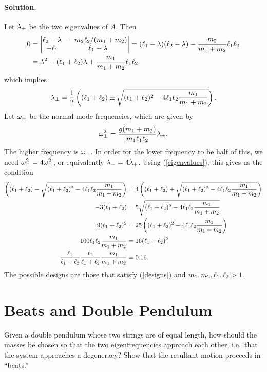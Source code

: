 \documentclass[11pt]{article}
\newcommand{\refeq}[1]{(\ref{#1})}
\newenvironment{statement}
{
    \color{darkgray}
    \ignorespaces
}
{
}
\newenvironment{solution}
{
    \paragraph{Solution.}
    \ignorespaces
}
{
    \bigskip
}
\renewcommand{\vec}[1]{\mathbf{#1}}
\begin{document}
\begin{solution}
	Let $\lambda_\pm$ be the two eigenvalues of $A$.  Then
	\begin{align}
		0 &= \mdet{\elw - \lambda & -\mw \elw / (\mq + \mw) \\ -\elq & \elq - \lambda} = (\elq - \lambda) (\elw - \lambda) - \frac{\mw}{\mq + \mw} \elq \elw \\
		&= \lambda^2 - (\elq + \elw) \lambda + \frac{\mq}{\mq + \mw} \elq \elw
	\end{align}
	which implies
	\begin{equation} \label{eigenvalues}
		\lambda_\pm = \frac{1}{2} \left( (\ell_1 + \ell_2) \pm \sqrt{(\ell_1 + \ell_2)^2 - 4 \ell_1 \ell_2 \frac{m_1}{m_1 + m_2}} \right).
	\end{equation}
	Let $\omega_\pm$ be the normal mode frequencies, which are given by
	\begin{equation} \label{frequencies}
		\omega_\pm^2 = \frac{g (m_1 + m_2)}{m_1 \ell_1 \ell_2} \lambda_\pm.
	\end{equation}
	The higher frequency is $\omega_-$.  In order for the lower frequency to be half of this, we need $\omega_-^2 = 4 \omega_+^2$, or equivalently $\lambda_- = 4 \lambda_+$.  Using \refeq{eigenvalues}, this gives us the condition
	\begin{align}
		\left( (\ell_1 + \ell_2) - \sqrt{(\ell_1 + \ell_2)^2 - 4 \ell_1 \ell_2 \frac{m_1}{m_1 + m_2}} \right) &= 4 \left( (\ell_1 + \ell_2) + \sqrt{(\ell_1 + \ell_2)^2 - 4 \ell_1 \ell_2 \frac{m_1}{m_1 + m_2}} \right) \\
		-3 (\ell_1 + \ell_2) &= 5 \sqrt{(\ell_1 + \ell_2)^2 - 4 \ell_1 \ell_2 \frac{m_1}{m_1 + m_2}} \\
		9 (\ell_1 + \ell_2)^2 &= 25 \left( (\ell_1 + \ell_2)^2 - 4 \ell_1 \ell_2 \frac{m_1}{m_1 + m_2} \right) \\
		100 \ell_1 \ell_2 \frac{m_1}{m_1 + m_2} &= 16 (\ell_1 + \ell_2)^2 \\
		\frac{\ell_1}{\ell_1 + \ell_2} \frac{\ell_2}{\ell_1 + \ell_2} \frac{m_1}{m_1 + m_2} &= 0.16. \label{designs}
	\end{align}
	The possible designs are those that satisfy \refeq{designs} and $m_1, m_2, \ell_1, \ell_2 > 1$.
\end{solution}

\newcommand{\vv}{\vec{v}}
\newcommand{\vvpm}{\vec{v}_\pm}
\newcommand{\vq}{v_1}
\newcommand{\vw}{v_2}

\newcommand{\Cp}{C_+}
\newcommand{\Cm}{C_-}
\newcommand{\Cpm}{C_\pm}
\newcommand{\php}{\phi_+}
\newcommand{\phm}{\phi_-}
\newcommand{\phpm}{\phi_\pm}

\section{Beats and Double Pendulum} \label{prob3}
\begin{statement}
	Given a double pendulum whose two strings are of equal length, how should the masses be chosen so that the two eigenfrequencies approach each other, i.e.~that the system approaches a degeneracy?  Show that the resultant motion proceeds in ``beats.''
\end{statement}
\end{document}
